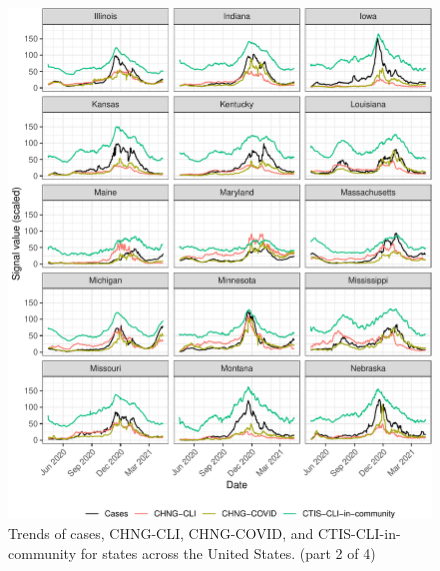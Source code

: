 \documentclass[9pt,twoside,lineno]{pnas-new}
\begin{document}
\begin{figure}

{\centering \includegraphics[width=\textwidth]{fig/state-trend-grids-2-1} 

}

\caption{Trends of cases, CHNG-CLI, CHNG-COVID, and CTIS-CLI-in-community for states across the United States. (part 2 of 4)}\label{fig:state-trend-grids-2}
\end{figure}

\clearpage
\end{document}
